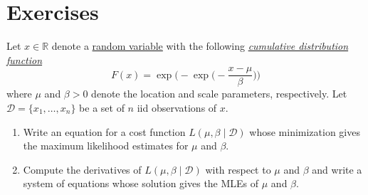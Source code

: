 \section{Exercises} 

  \begin{exercise}
    Let $x \in \mathbb{R}$ denote a \hyperref[prob-def:random-variable]{random variable} with the following \textit{\hyperref[prob-def:cumulative-distribution-function]{cumulative distribution function}} 
    \begin{equation}
      F(x) = \exp \bigg( - \exp \bigg( - \frac{x - \mu}{\beta} \bigg) \bigg)
    \end{equation}
    where $\mu$ and $\beta > 0$ denote the location and scale parameters, respectively. Let $\mathcal{D} = \{x_1, \ldots, x_n\}$ be a set of $n$ iid observations of $x$. 
    \begin{enumerate}
      \item Write an equation for a cost function $L(\mu, \beta \mid \mathcal{D})$ whose minimization gives the maximum likelihood estimates for $\mu$ and $\beta$. 
      \item Compute the derivatives of $L(\mu, \beta \mid \mathcal{D})$ with respect to $\mu$ and $\beta$ and write a system of equations whose solution gives the MLEs of $\mu$ and $\beta$. 
    \end{enumerate}
  \end{exercise}
